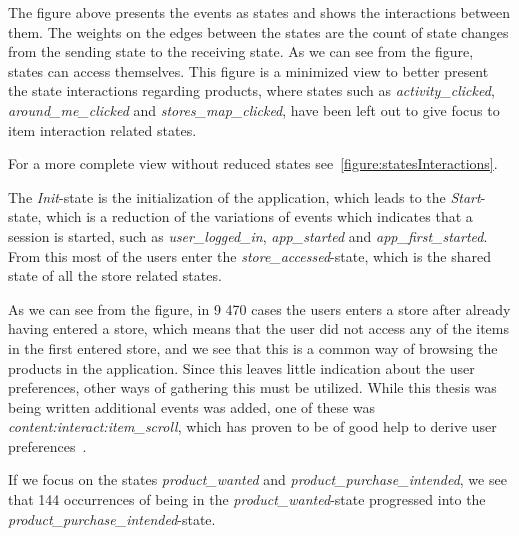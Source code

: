 The figure above presents the events as states and shows the interactions
between them.  The weights on the edges between the states are the count of
state changes from the sending state to the receiving state.  As we can see
from the figure, states can access themselves.  This figure is a minimized view
to better present the state interactions regarding products, where states such
as \emph{activity\_clicked}, \emph{around\_me\_clicked} and
\emph{stores\_map\_clicked}, have been left out to give focus to item
interaction related states.

For a more complete view without reduced states see~\ref{figure:statesInteractions}.

The \emph{Init}-state is the initialization of the application, which leads to
the \emph{Start}-state, which is a reduction of the variations of events which
indicates that a session is started, such as \emph{user\_logged\_in},
\emph{app\_started} and \emph{app\_first\_started}.  From this most of the
users enter the \emph{store\_accessed}-state, which is the shared state of all
the store related states.

As we can see from the figure, in 9 470 cases the users enters a store after
already having entered a store, which means that the user did not access any of
the items in the first entered store, and we see that this is a common way of
browsing the products in the application. Since this leaves little indication
about the user preferences, other ways of gathering this must be utilized.
While this thesis was being written additional events was added, one of these
was \emph{content:interact:item\_scroll}, which has proven to be of good help
to derive user preferences~\cite{Claypool01inferringuser}.

If we focus on the states \emph{product\_wanted} and
\emph{product\_purchase\_intended}, we see that 144 occurrences of being in the
\emph{product\_wanted}-state progressed into the
\emph{product\_purchase\_intended}-state.









